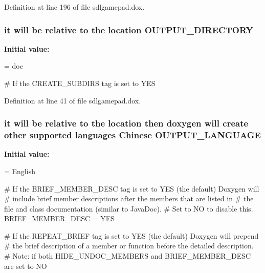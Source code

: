 Definition at line 196 of file sdlgamepad.\-dox.

\hypertarget{sdlgamepad_8dox_a0210526ada4ed067410fb4f078b8ae3f}{
\subsubsection[{O\-U\-T\-P\-U\-T\-\_\-\-D\-I\-R\-E\-C\-T\-O\-R\-Y}]{\setlength{\rightskip}{0pt plus 5cm}it will be relative to the {\bf location} O\-U\-T\-P\-U\-T\-\_\-\-D\-I\-R\-E\-C\-T\-O\-R\-Y}}\label{sdlgamepad_8dox_a0210526ada4ed067410fb4f078b8ae3f}
{\bfseries Initial value\-:}
\begin{DoxyCode}
= doc

\textcolor{preprocessor}{# If the CREATE\_SUBDIRS tag is set to YES}
\end{DoxyCode}


Definition at line 41 of file sdlgamepad.\-dox.

\hypertarget{sdlgamepad_8dox_a70b2dc2bbbd06aad351734d9f602edd0}{
\subsubsection[{O\-U\-T\-P\-U\-T\-\_\-\-L\-A\-N\-G\-U\-A\-G\-E}]{\setlength{\rightskip}{0pt plus 5cm}it will be relative to the {\bf location} then doxygen will create other supported languages {\bf Chinese} O\-U\-T\-P\-U\-T\-\_\-\-L\-A\-N\-G\-U\-A\-G\-E}}\label{sdlgamepad_8dox_a70b2dc2bbbd06aad351734d9f602edd0}
{\bfseries Initial value\-:}
\begin{DoxyCode}
= English

\textcolor{preprocessor}{# If the BRIEF\_MEMBER\_DESC tag is set to YES (the default) Doxygen will}
\textcolor{preprocessor}{}\textcolor{preprocessor}{# include brief member descriptions after the members that are listed in}
\textcolor{preprocessor}{}\textcolor{preprocessor}{# the file and class documentation (similar to JavaDoc).}
\textcolor{preprocessor}{}\textcolor{preprocessor}{# Set to NO to disable this.}
\textcolor{preprocessor}{}
BRIEF\_MEMBER\_DESC      = YES

\textcolor{preprocessor}{# If the REPEAT\_BRIEF tag is set to YES (the default) Doxygen will prepend}
\textcolor{preprocessor}{}\textcolor{preprocessor}{# the brief description of a member or function before the detailed description.}
\textcolor{preprocessor}{# Note: if both HIDE\_UNDOC\_MEMBERS and BRIEF\_MEMBER\_DESC are set to NO}
\end{DoxyCode}


